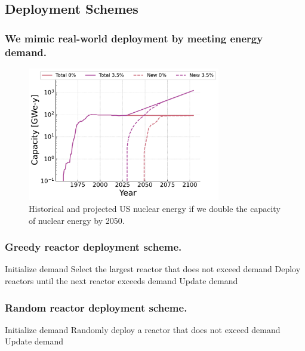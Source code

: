 \documentclass[9pt]{beamer}
\begin{document}
  \subsection{Deployment Schemes}
  \begin{frame}
    \frametitle{We mimic real-world deployment by meeting energy demand.}
    \begin{figure}
      \centering
      \includegraphics[width=0.75\textwidth]{images/new_capacity_ng_d2.pdf}
      \caption{Historical and projected US nuclear energy if we double the capacity of nuclear energy by 2050.}
    \end{figure}
  \end{frame}

  \begin{frame}
    \frametitle{Greedy reactor deployment scheme.}
      \begin{algorithmic}[1]
          \State Initialize demand
              \State Select the largest reactor that does not exceed demand
              \State Deploy reactors until the next reactor exceeds demand
              \State Update demand
          \EndWhile
      \end{algorithmic}
  \end{frame}

  \begin{frame}
    \frametitle{Random reactor deployment scheme.}
      \begin{algorithmic}[1]
          \State Initialize demand
              \State Randomly deploy a reactor that does not exceed demand
              \State Update demand
          \EndWhile
      \end{algorithmic}
  \end{frame}
\end{document}
